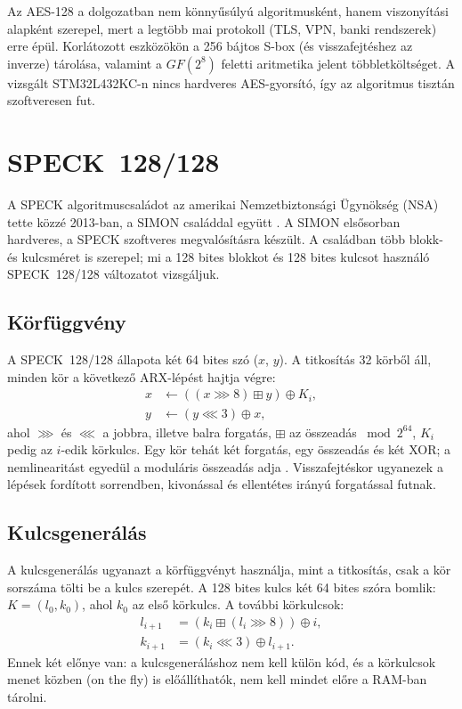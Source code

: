 \documentclass[a4paper,12pt]{report}
\theoremstyle{definition}
\theoremstyle{remark}
\begin{document}
Az AES-128 a dolgozatban nem könnyűsúlyú algoritmusként, hanem viszonyítási alapként szerepel, mert a legtöbb mai protokoll (TLS, VPN, banki rendszerek) erre épül. Korlátozott eszközökön a 256 bájtos S-box (és visszafejtéshez az inverze) tárolása, valamint a $GF(2^8)$ feletti aritmetika jelent többletköltséget. A vizsgált STM32L432KC-n nincs hardveres AES-gyorsító, így az algoritmus tisztán szoftveresen fut.

\section{SPECK~128/128}\label{sec:speck}

A SPECK algoritmuscsaládot az amerikai Nemzetbiztonsági Ügynökség (NSA) tette közzé 2013-ban, a SIMON családdal együtt \cite{Beaulieu2013}. A SIMON elsősorban hardveres, a SPECK szoftveres megvalósításra készült. A családban több blokk- és kulcsméret is szerepel; mi a 128 bites blokkot és 128 bites kulcsot használó SPECK~128/128 változatot vizsgáljuk.

\subsection{Körfüggvény}\label{sec:speck_kor}

A SPECK~128/128 állapota két 64 bites szó ($x$, $y$). A titkosítás 32 körből áll, minden kör a következő ARX-lépést hajtja végre:
\begin{align}
x &\leftarrow ((x \ggg 8) \mathbin{\boxplus} y) \oplus K_i, \label{eq:speck_round1}\\
y &\leftarrow (y \lll 3) \oplus x, \label{eq:speck_round2}
\end{align}
ahol $\ggg$ és $\lll$ a jobbra, illetve balra forgatás, $\boxplus$ az összeadás $\bmod 2^{64}$, $K_i$ pedig az $i$-edik körkulcs. Egy kör tehát két forgatás, egy összeadás és két XOR; a nemlinearitást egyedül a moduláris összeadás adja \cite{Beaulieu2013}. Visszafejtéskor ugyanezek a lépések fordított sorrendben, kivonással és ellentétes irányú forgatással futnak.

\subsection{Kulcsgenerálás}\label{sec:speck_kulcs}

A kulcsgenerálás ugyanazt a körfüggvényt használja, mint a titkosítás, csak a kör sorszáma tölti be a kulcs szerepét. A 128 bites kulcs két 64 bites szóra bomlik: $K = (l_0, k_0)$, ahol $k_0$ az első körkulcs. A további körkulcsok:
\begin{align}
l_{i+1} &= (k_i \mathbin{\boxplus} (l_i \ggg 8)) \oplus i, \\
k_{i+1} &= (k_i \lll 3) \oplus l_{i+1}.
\end{align}
Ennek két előnye van: a kulcsgeneráláshoz nem kell külön kód, és a körkulcsok menet közben (on the fly) is előállíthatók, nem kell mindet előre a RAM-ban tárolni.
\end{document}
